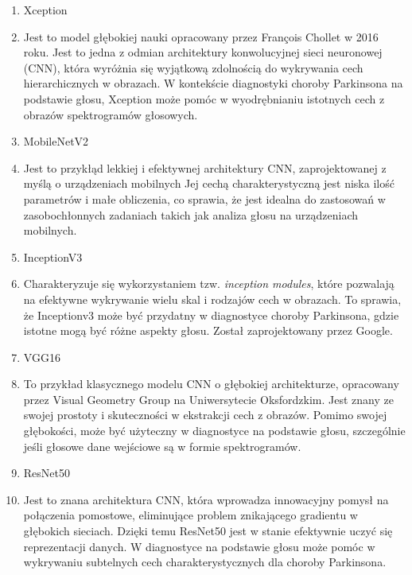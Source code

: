 \begin{enumerate}[label={\alph*)}]
	\item Xception
    \item [] Jest to model głębokiej nauki opracowany przez François Chollet w 2016 roku.
    Jest to jedna z odmian architektury konwolucyjnej sieci neuronowej (CNN), która wyróżnia się wyjątkową zdolnością do wykrywania cech hierarchicznych w obrazach.
    W kontekście diagnostyki choroby Parkinsona na podstawie głosu, Xception może pomóc w wyodrębnianiu istotnych cech z obrazów spektrogramów głosowych.

    \item MobileNetV2
    \item [] Jest to przykłąd lekkiej i efektywnej architektury CNN, zaprojektowanej z myślą o urządzeniach mobilnych
    Jej cechą charakterystyczną jest niska ilość parametrów i małe obliczenia, co sprawia, że jest idealna do zastosowań w zasobochłonnych zadaniach takich jak analiza głosu na urządzeniach mobilnych.

    \item InceptionV3
    \item []  Charakteryzuje się wykorzystaniem tzw. \emph{inception modules}, które pozwalają na efektywne wykrywanie wielu skal i rodzajów cech w obrazach.
    To sprawia, że Inceptionv3 może być przydatny w diagnostyce choroby Parkinsona, gdzie istotne mogą być różne aspekty głosu.
    Został zaprojektowany przez Google.

    \item VGG16
    \item [] To przykład klasycznego modelu CNN o głębokiej architekturze, opracowany przez Visual Geometry Group na Uniwersytecie Oksfordzkim.
    Jest znany ze swojej prostoty i skuteczności w ekstrakcji cech z obrazów.
    Pomimo swojej głębokości, może być użyteczny w diagnostyce na podstawie głosu, szczególnie jeśli głosowe dane wejściowe są w formie spektrogramów.

    \item ResNet50
    \item [] Jest to znana architektura CNN, która wprowadza innowacyjny pomysł na połączenia pomostowe, eliminujące problem znikającego gradientu w głębokich sieciach.
    Dzięki temu ResNet50 jest w stanie efektywnie uczyć się reprezentacji danych.
    W diagnostyce na podstawie głosu może pomóc w wykrywaniu subtelnych cech charakterystycznych dla choroby Parkinsona.
\end{enumerate}

